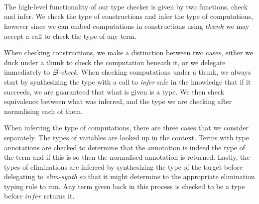 {\begin{code}
\AgdaSymbol{\{}\AgdaSymbol{\}}\AgdaSpace{}%
\AgdaSymbol{(}\AgdaSpace{}%
\AgdaSpace{}%
\AgdaSymbol{)}\AgdaSpace{}%
\AgdaSymbol{(}\AgdaSpace{}%
\AgdaSpace{}%
\AgdaSymbol{)}\AgdaSpace{}%
\AgdaSymbol{=}%
\>[273I]\<%
\\
\>[273I][@{}l@{\AgdaIndent{0}}]%
\>[35]\AgdaSymbol{\AgdaUnderscore{}}\AgdaSpace{}%
\AgdaSpace{}%
\AgdaSpace{}%
\AgdaSpace{}%
\<%
\\
%
\>[35]\AgdaSpace{}%
\<%
\\
\>[0]\AgdaSpace{}%
\AgdaSpace{}%
%
\>[10]\AgdaSymbol{=}\AgdaSpace{}%
\AgdaSpace{}%
\AgdaSymbol{(}\AgdaSpace{}%
\AgdaOperator{\AgdaFunction{++}}\AgdaSpace{}%
\AgdaSpace{}%
\AgdaSpace{}%
\AgdaOperator{\AgdaFunction{++}}\AgdaSpace{}%
\AgdaSpace{}%
\AgdaOperator{\AgdaFunction{++}}\AgdaSpace{}%
\AgdaSpace{}%
\AgdaSymbol{)}\<%
\end{code}
}

The high-level functionality of our type checker is given by two functions,
check and infer. We check the type of constructions and infer the type of
computations, however since we can embed computations in constructions using
$thunk$ we may accept a call to check the type of any term.

When checking constructions, we make a distinction between two cases,
either we duck under a thunk to check the computation beneath it, or we
delegate immediately to \emph{∋-check}. When checking computations under a thunk,
we always start by synthesizing the type with a call to \emph{infer} safe in the
knowledge that if it succeeds, we are guaranteed that what is given is a type.
We then check equivalence between what was inferred, and the type we are checking
after normalising each of them.

When inferring the type of computations, there are three cases that we consider
separately. The types of variables are looked up in the context. Terms with type
annotations are checked to determine that the annotation is indeed the type of
the term and if this is so then the normalised annotation is returned. Lastly,
the types of eliminations are inferred by synthesizing the type of the target
before delegating to \emph{elim-synth} so that it might determine to the appropriate
elimination typing rule to run. Any term given back in this process is checked to
be a type before $infer$ returns it.

